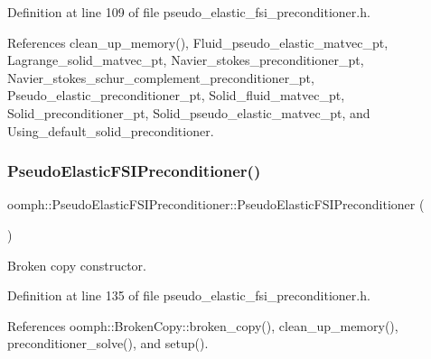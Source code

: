 Definition at line 109 of file pseudo\+\_\+elastic\+\_\+fsi\+\_\+preconditioner.\+h.



References clean\+\_\+up\+\_\+memory(), Fluid\+\_\+pseudo\+\_\+elastic\+\_\+matvec\+\_\+pt, Lagrange\+\_\+solid\+\_\+matvec\+\_\+pt, Navier\+\_\+stokes\+\_\+preconditioner\+\_\+pt, Navier\+\_\+stokes\+\_\+schur\+\_\+complement\+\_\+preconditioner\+\_\+pt, Pseudo\+\_\+elastic\+\_\+preconditioner\+\_\+pt, Solid\+\_\+fluid\+\_\+matvec\+\_\+pt, Solid\+\_\+preconditioner\+\_\+pt, Solid\+\_\+pseudo\+\_\+elastic\+\_\+matvec\+\_\+pt, and Using\+\_\+default\+\_\+solid\+\_\+preconditioner.

\mbox{\label{classoomph_1_1PseudoElasticFSIPreconditioner_aa7efe57119bf77e503049922f8d16722}} 
\subsubsection{\texorpdfstring{Pseudo\+Elastic\+F\+S\+I\+Preconditioner()}{PseudoElasticFSIPreconditioner()}\hspace{0.1cm}{\footnotesize\ttfamily [2/2]}}
{\footnotesize\ttfamily oomph\+::\+Pseudo\+Elastic\+F\+S\+I\+Preconditioner\+::\+Pseudo\+Elastic\+F\+S\+I\+Preconditioner (\begin{DoxyParamCaption}\item[{const \hyperlink{classoomph_1_1PseudoElasticFSIPreconditioner}{Pseudo\+Elastic\+F\+S\+I\+Preconditioner} \&}]{ }\end{DoxyParamCaption})\hspace{0.3cm}{\ttfamily [inline]}}



Broken copy constructor. 



Definition at line 135 of file pseudo\+\_\+elastic\+\_\+fsi\+\_\+preconditioner.\+h.



References oomph\+::\+Broken\+Copy\+::broken\+\_\+copy(), clean\+\_\+up\+\_\+memory(), preconditioner\+\_\+solve(), and setup().




